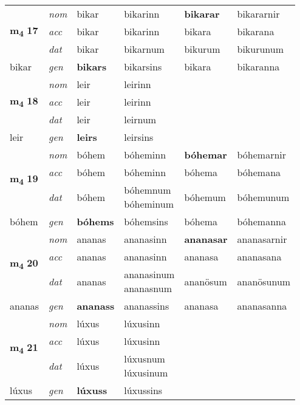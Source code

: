 \begin{longtable}[l]{X>{\footnotesize\itshape}XXXXX}
\multirow{3}{*}{{{\textbf{m{\textsubscript{4}}} \Large{\textbf{17}}}}} & nom & bikar & bikarinn & \textbf{bikarar} & bikararnir \\*
 & acc & bikar & bikarinn & bikara & bikarana \\*
 & dat & bikar & bikarnum & bikurum & bikurunum \\*
 {\footnotesize{bikar}} & gen & \textbf{bikars} & bikarsins & bikara & bikaranna \\
\cmidrule{1-6}

\multirow{3}{*}{{{\textbf{m{\textsubscript{4}}} \Large{\textbf{18}}}}} & nom & leir & leirinn & \textbf{} &  \\*
 & acc & leir & leirinn &  &  \\*
 & dat & leir & leirnum &  &  \\*
 {\footnotesize{leir}} & gen & \textbf{leirs} & leirsins &  &  \\
\cmidrule{1-6}

\multirow{3}{*}{{{\textbf{m{\textsubscript{4}}} \Large{\textbf{19}}}}} & nom & bóhem & bóheminn & \textbf{bóhemar} & bóhemarnir \\*
 & acc & bóhem & bóheminn & bóhema & bóhemana \\*
 & dat & bóhem & \specialcell{bóhemnum\\ bóheminum} & bóhemum & bóhemunum \\*
 {\footnotesize{bóhem}} & gen & \textbf{bóhems} & bóhemsins & bóhema & bóhemanna \\
\cmidrule{1-6}

\multirow{3}{*}{{{\textbf{m{\textsubscript{4}}} \Large{\textbf{20}}}}} & nom & ananas & ananasinn & \textbf{ananasar} & ananasarnir \\*
 & acc & ananas & ananasinn & ananasa & ananasana \\*
 & dat & ananas & \specialcell{ananasinum\\ ananasnum} & ananösum & ananösunum \\*
 {\footnotesize{ananas}} & gen & \textbf{ananass} & ananassins & ananasa & ananasanna \\
\cmidrule{1-6}

\multirow{3}{*}{{{\textbf{m{\textsubscript{4}}} \Large{\textbf{21}}}}} & nom & lúxus & lúxusinn & \textbf{} &  \\*
 & acc & lúxus & lúxusinn &  &  \\*
 & dat & lúxus & \specialcell{lúxusnum\\ lúxusinum} &  &  \\*
 {\footnotesize{lúxus}} & gen & \textbf{lúxuss} & lúxussins &  &  \\
\cmidrule{1-6}


\end{longtable}
